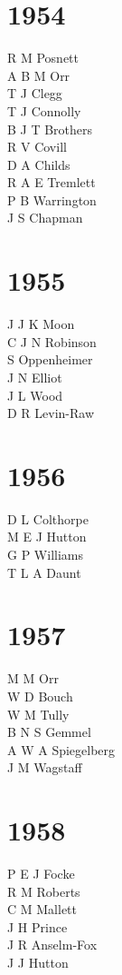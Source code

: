 \begin{multicols}{2}
  \section*{1954}
  R M Posnett \\
  A B M Orr \\
  T J Clegg \\
  T J Connolly \\
  B J T Brothers \\
  R V Covill \\
  D A Childs \\
  R A E Tremlett \\
  P B Warrington \\
  J S Chapman \\
  \section*{1955}
  J J K Moon \\
  C J N Robinson \\
  S Oppenheimer \\
  J N Elliot \\
  J L Wood \\
  D R Levin-Raw \\
  \section*{1956}
  D L Colthorpe \\
  M E J Hutton \\
  G P Williams \\
  T L A Daunt \\
  \section*{1957}
  M M Orr \\
  W D Bouch \\
  W M Tully \\
  B N S Gemmel \\
  A W A Spiegelberg \\
  J M Wagstaff \\
  \section*{1958}
  P E J Focke \\
  R M Roberts \\
  C M Mallett \\
  J H Prince \\
  J R Anselm-Fox \\
  J J Hutton \\

\end{multicols}
